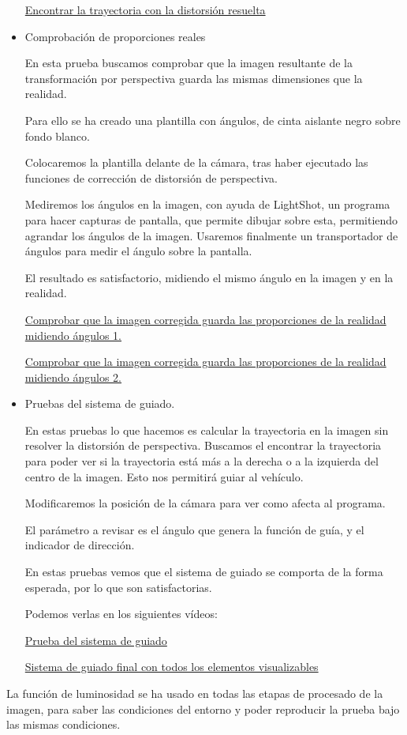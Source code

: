 \begin{itemize}
	
	\href{https://youtu.be/Ae5aTr3mg6k}{Encontrar la trayectoria con la distorsión resuelta}
	
	\item Comprobación de proporciones reales
	
	En esta prueba buscamos comprobar que la imagen resultante de la transformación por perspectiva guarda las mismas dimensiones que la realidad.
	
Para ello se ha creado una plantilla con ángulos, de cinta aislante negro sobre fondo blanco.

Colocaremos la plantilla delante de la cámara, tras haber ejecutado las funciones de corrección de distorsión de perspectiva.

Mediremos los ángulos en la imagen, con ayuda de LightShot, un programa para hacer capturas de pantalla, que permite dibujar sobre esta, permitiendo agrandar los ángulos de la imagen. Usaremos finalmente un transportador de ángulos para medir el ángulo sobre la pantalla.

El resultado es satisfactorio, midiendo el mismo ángulo en la imagen y en la realidad.
	
	\href{https://youtu.be/wc00piNmfyI}{Comprobar que la imagen corregida guarda las proporciones de la realidad midiendo ángulos 1.}
	
	\href{https://youtu.be/T0djIwql6G8}{Comprobar que la imagen corregida guarda las proporciones de la realidad midiendo ángulos 2.}
	
	\item Pruebas del sistema de guiado. 
	
	En estas pruebas lo que hacemos es calcular la trayectoria en la imagen sin resolver la distorsión de perspectiva. Buscamos el encontrar la trayectoria para poder ver si la trayectoria está más a la derecha o a la izquierda del centro de la imagen. Esto nos permitirá guiar al vehículo. 
	
	Modificaremos la posición de la cámara para ver como afecta al programa.
	
El parámetro a revisar es el ángulo que genera la función de guía, y el indicador de dirección.

En estas pruebas vemos que el sistema de guiado se comporta de la forma esperada, por lo que son satisfactorias.	
	
	Podemos verlas en los siguientes vídeos:
	
	\href{https://youtu.be/ODr3q91MLk0}{Prueba del sistema de guiado}
	
	\href{https://youtu.be/8j69cDydXfA}{Sistema de guiado final con todos los elementos visualizables}
	
	
\end{itemize}

La función de luminosidad se ha usado en todas las etapas de procesado de la imagen, para saber las condiciones del entorno y poder reproducir la prueba bajo las mismas condiciones.
